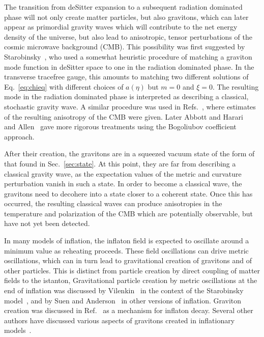 \documentclass[12pt,onecolumn,eqsecnum,floats,aps,prd,floatfix,titlepage,tightenlines]{revtex4-2}
\begin{document}
The transition from deSitter expansion to a subsequent radiation dominated phase will not only create matter particles,
but also gravitons, which can later appear as primordial gravity waves which will contribute to the net energy density
of the universe, but also lead to anisotropic, tensor perturbations of the cosmic microwave background (CMB). This possibility
was first suggested by Starobinsky~\cite{S79}, who used a  somewhat heuristic procedure of matching  a graviton mode
function in deSitter space to one in the radiation dominated phase. In the transverse tracefree gauge, this amounts to
matching two different solutions of Eq.~\eqref{eq:chieq} with different choices of $a(\eta)$ but $m=0$ and $\xi =0$.
The resulting mode in the radiation dominated phase  is interpreted as describing a classical, stochastic gravity wave.
A similar procedure was used in Refs.~\cite{RSV82,FP83,AW84a,AW84b}, where estimates of the resulting anisotropy
of the CMB were given. Later Abbott and Harari~\cite{AH86} and Allen~\cite{A88} gave more rigorous treatments using
the Bogoliubov coefficient approach.

After their creation, the gravitons are in a squeezed vacuum state of the form of that found in Sec.~\ref{sec:state}. At
this point, they are far from describing a classical gravity wave, as the expectation values of the metric and curvature
perturbation vanish in such a state. In order to become a classical wave, the gravitons need to decohere into a state
closer to a coherent state.
Once this has occurred, the resulting classical waves can produce anisotropies in the temperature and polarization of the
CMB which are potentially  observable, but have not yet been detected.

In many models of inflation, the inflaton field is expected to oscillate around a minimum value as reheating proceeds.
These field oscillations can drive metric oscillations, which can in turn lead to gravitational creation of gravitons and
of other particles. This is distinct from particle creation by direct coupling of matter fields to the istanton, Gravitational
particle creation by metric oscillations at the end of inflation was discussed by Vilenkin~\cite{Vilenkin:1985} in the context of the
Starobinsky model~\cite{Starobinsky80}, and by Suen and Anderson~\cite{SA87} in other  versions of inflation.
Graviton creation was discussed in Ref.~\cite{Ema:2015}  as a mechanism for inflaton decay. 
Several other authors have discussed various aspects of gravitons created in inflationary 
models~\cite{Yainik90,Grishchuk-Sidorov90,Maia93,Henriques94,Mendes99,Allen2000,Henriques04,Giovannini20}. 
\end{document}
